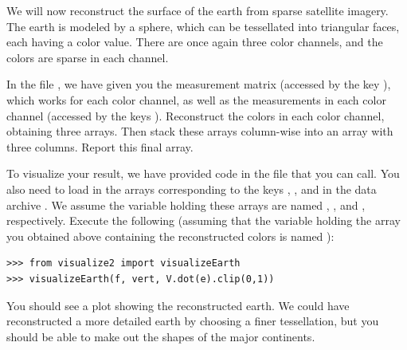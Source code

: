 \begin{problem}
We will now reconstruct the surface of the earth from sparse satellite imagery. The earth is modeled by a sphere,
which can be tessellated into triangular faces, each having a color value. There are once again three color 
channels, and the colors are sparse in each channel. 

In the file , we have given you the measurement matrix (accessed by the key ),
which works for each color channel, as well as the measurements in each color channel
(accessed by the keys ). Reconstruct the colors in each color channel, obtaining
three arrays. Then stack these arrays column-wise into an array with three columns. Report this final array.

To visualize your result, we have provided code in the file  that you can call.
You also need to load in the arrays corresponding to the keys ,
, and  in the data archive
. We assume the variable holding these arrays are named , ,
and ,
respectively.
Execute the following (assuming that the variable holding the array
you obtained above containing the reconstructed colors is named ):
\begin{lstlisting}
>>> from visualize2 import visualizeEarth
>>> visualizeEarth(f, vert, V.dot(e).clip(0,1))
\end{lstlisting}
You should see a plot showing the reconstructed earth. We could have reconstructed a more detailed
earth by choosing a finer tessellation, but you should be able to make out the shapes of the major continents.
\end{problem}